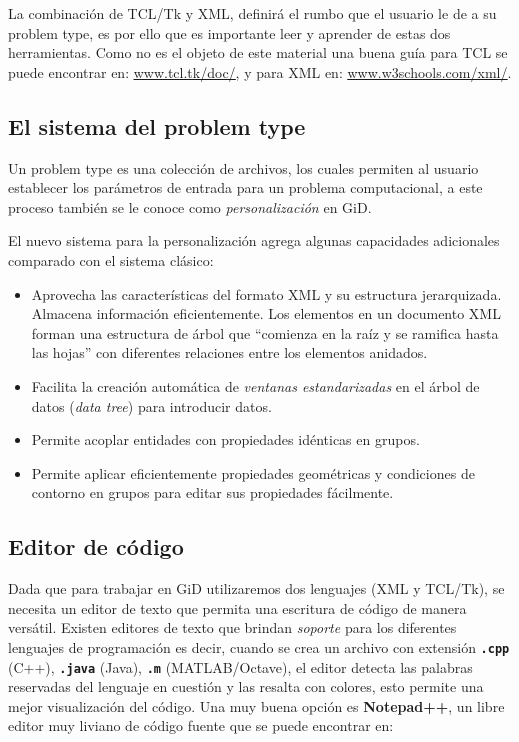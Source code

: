 \documentclass[10pt, a4paper, twocolumn]{article}
\begin{document}
La combinación de TCL/Tk y XML, definirá el rumbo que el usuario le de a su problem type, es por ello que es importante leer y aprender de estas dos herramientas. Como no es el objeto de este material una buena guía para TCL se puede encontrar en: \textcolor{BlueGiD}{\underline{\url{www.tcl.tk/doc/}}\label{sec:manualTCL}}, y para XML en: \textcolor{BlueGiD}{\underline{\url{www.w3schools.com/xml/}}}.

\subsection{El sistema del problem type}

Un problem type es una colección de archivos, los cuales permiten al usuario establecer los parámetros de entrada para un problema computacional, a este proceso también se le conoce como \textit{personalización} en GiD. 

El nuevo sistema para la personalización agrega algunas capacidades adicionales comparado con el sistema clásico:

\begin{itemize}
	\item Aprovecha las características del formato XML y su estructura jerarquizada. Almacena información eficientemente. Los elementos en un documento XML forman una estructura de árbol que ``comienza en la raíz y se ramifica hasta las hojas'' con diferentes relaciones entre los elementos anidados.
	\item Facilita la creación automática de \textit{ventanas estandarizadas} en el árbol de datos (\textit{data tree}) para introducir datos.
	\item Permite acoplar entidades con propiedades idénticas en grupos.
	\item Permite aplicar eficientemente propiedades geométricas y condiciones de contorno en grupos para editar sus propiedades fácilmente.
\end{itemize}

\subsection{Editor de código}

Dada que para trabajar en GiD utilizaremos dos lenguajes (XML y TCL/Tk), se necesita un editor de texto que permita una escritura de código de manera versátil. Existen editores de texto que brindan \textit{soporte} para los diferentes lenguajes de programación es decir, cuando se crea un archivo con extensión \textbf{\texttt{.cpp}} (C++), \textbf{\texttt{.java}} (Java), \textbf{\texttt{.m}} (MATLAB/Octave), el editor detecta las palabras reservadas del lenguaje en cuestión y las resalta con colores, esto permite una mejor visualización del código. Una muy buena opción es \textbf{Notepad++}, un libre editor muy liviano de código fuente que se puede encontrar en:\\ 
\end{document}
